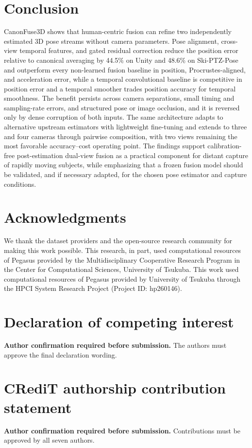 \documentclass[preprint,12pt]{elsarticle}
\begin{document}
\section{Conclusion}
\label{sec:conclusion}

CanonFuse3D shows that human-centric fusion can refine two independently estimated 3D pose streams without camera parameters. Pose alignment, cross-view temporal features, and gated residual correction reduce the position error relative to canonical averaging by 44.5\% on Unity and 48.6\% on Ski-PTZ-Pose and outperform every non-learned fusion baseline in position, Procrustes-aligned, and acceleration error, while a temporal convolutional baseline is competitive in position error and a temporal smoother trades position accuracy for temporal smoothness. The benefit persists across camera separations, small timing and sampling-rate errors, and structured pose or image occlusion, and it is reversed only by dense corruption of both inputs. The same architecture adapts to alternative upstream estimators with lightweight fine-tuning and extends to three and four cameras through pairwise composition, with two views remaining the most favorable accuracy--cost operating point. The findings support calibration-free post-estimation dual-view fusion as a practical component for distant capture of rapidly moving subjects, while emphasizing that a frozen fusion model should be validated, and if necessary adapted, for the chosen pose estimator and capture conditions.

\section*{Acknowledgments}
We thank the dataset providers and the open-source research community for making this work possible. This research, in part, used computational resources of Pegasus provided by the Multidisciplinary Cooperative Research Program in the Center for Computational Sciences, University of Tsukuba. This work used computational resources of Pegasus provided by University of Tsukuba through the HPCI System Research Project (Project ID: hp260146).

\section*{Declaration of competing interest}
\textbf{Author confirmation required before submission.} The authors must approve the final declaration wording.

\section*{CRediT authorship contribution statement}
\textbf{Author confirmation required before submission.} Contributions must be approved by all seven authors.
\end{document}
